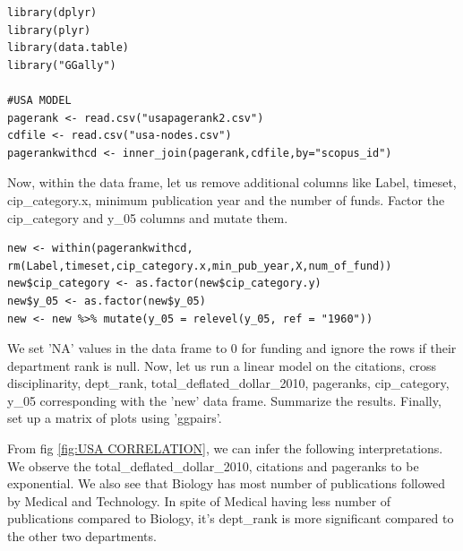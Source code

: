 \documentclass[a4paper,11pt]{article}
\theoremstyle{mytheor}
\begin{document}
\begin{lstlisting}
library(dplyr)
library(plyr)
library(data.table)
library("GGally")

#USA MODEL
pagerank <- read.csv("usapagerank2.csv")
cdfile <- read.csv("usa-nodes.csv")
pagerankwithcd <- inner_join(pagerank,cdfile,by="scopus_id")
\end{lstlisting}

Now, within the data frame, let us remove additional columns like Label, timeset, cip\_category.x, minimum publication year and the number of funds.  Factor the cip\_category and y\_05 columns and mutate them.

\begin{lstlisting}
new <- within(pagerankwithcd, rm(Label,timeset,cip_category.x,min_pub_year,X,num_of_fund))
new$cip_category <- as.factor(new$cip_category.y)
new$y_05 <- as.factor(new$y_05)
new <- new %>% mutate(y_05 = relevel(y_05, ref = "1960"))
\end{lstlisting}

We set 'NA' values in the data frame to 0 for funding and ignore the rows if their department rank is null. Now, let us run a linear model on the citations, cross disciplinarity, dept\_rank, total\_deflated\_dollar\_2010, pageranks, cip\_category, y\_05 corresponding with the 'new' data frame. Summarize the results. Finally, set up a matrix of plots using 'ggpairs'.

From fig \ref{fig:USA CORRELATION}, we can infer the following interpretations. We observe the total\_deflated\_dollar\_2010, citations and pageranks to be exponential. We also see that Biology has most number of publications followed by Medical and Technology. In spite of Medical having less number of publications compared to Biology, it's dept\_rank is more significant compared to the other two departments. 
\end{document}
